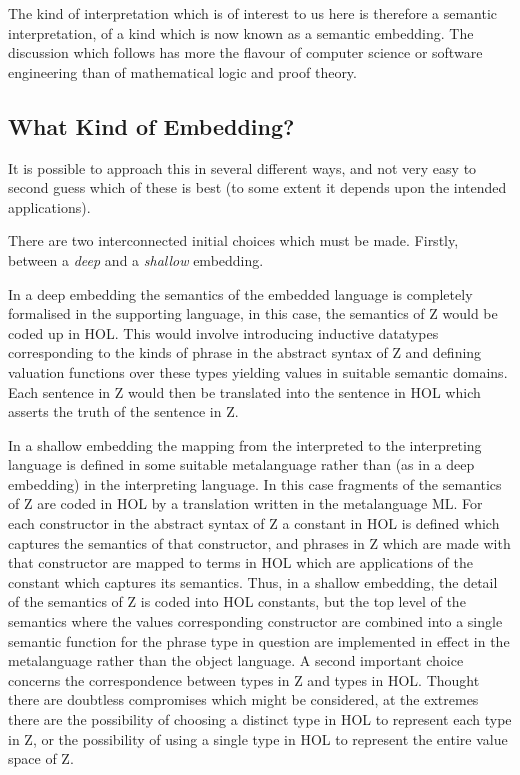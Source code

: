 \documentclass[10pt,titlepage]{book}
\begin{document}
The kind of interpretation which is of interest to us here is therefore a semantic interpretation, of a kind which is now known as a semantic embedding.
The discussion which follows has more the flavour of computer science or software engineering than of mathematical logic and proof theory.

\subsection{What Kind of Embedding?}

It is possible to approach this in several different ways, and not very easy to second guess which of these is best (to some extent it depends upon the intended applications).

There are two interconnected initial choices which must be made.
Firstly, between a {\it deep} and a {\it shallow} embedding.

In a deep embedding the semantics of the embedded language is completely formalised in the supporting language, in this case, the semantics of Z would be coded up in HOL.
This would involve introducing inductive datatypes corresponding to the kinds of phrase in the abstract syntax of Z and defining valuation functions over these types yielding values in suitable semantic domains.
Each sentence in Z would then be translated into the sentence in HOL which asserts the truth of the sentence in Z.

In a shallow embedding the mapping from the interpreted to the interpreting language is defined in some suitable metalanguage rather than (as in a deep embedding) in the interpreting language.
In this case fragments of the semantics of Z are coded in HOL by a translation written in the metalanguage ML.
For each constructor in the abstract syntax of Z a constant in HOL is defined which captures the semantics of that constructor, and phrases in Z which are made with that constructor are mapped to terms in HOL which are applications of the constant which captures its semantics.
Thus, in a shallow embedding, the detail of the semantics of Z is coded into HOL constants, but the top level of the semantics where the values corresponding constructor are combined into a single semantic function for the phrase type in question are implemented in effect in the metalanguage rather than the object language.
A second important choice concerns the correspondence between types in Z and types in HOL.
Thought there are doubtless compromises which might be considered, at the extremes there are the possibility of choosing a distinct type in HOL to represent each type in Z, or the possibility of using a single type in HOL to represent the entire value space of Z.
\end{document}
